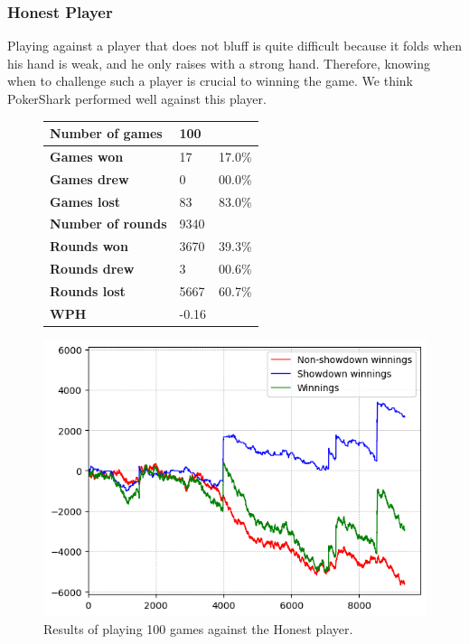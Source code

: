 \subsubsection{Honest Player}
Playing against a player that does not bluff is quite difficult because it folds when his hand is weak, and he only raises with a strong hand. Therefore, knowing when to challenge such a player is crucial to winning the game. We think PokerShark performed well against this player.
\begin{figure}[H]
    \centering
    \begin{minipage}{\textwidth}
        \begin{minipage}{0.40\textwidth}
            \begin{tabular}{|l|l|l|}
                \hline
                \textbf{Number of games}  & 100   &        \\ \hline
                \textbf{Games won}        & 17    & 17.0\% \\ \hline
                \textbf{Games drew}       & 0     & 00.0\%  \\ \hline
                \textbf{Games lost}       & 83    & 83.0\% \\ \hline
                \textbf{Number of rounds} & 9340  &        \\ \hline
                \textbf{Rounds won}       & 3670  & 39.3\% \\ \hline
                \textbf{Rounds drew}      & 3     & 00.6\%  \\ \hline
                \textbf{Rounds lost}      & 5667  & 60.7\% \\ \hline
                \textbf{WPH}              & -0.16 &        \\ \hline
            \end{tabular}
        \end{minipage}
        \hspace{0.05\textwidth}
        \begin{minipage}{0.5\textwidth}
            \includegraphics[width=\textwidth]{graphics/honest.png}
        \end{minipage}
    \end{minipage}
    \caption{Results of playing 100 games against the Honest player.}
\end{figure}


